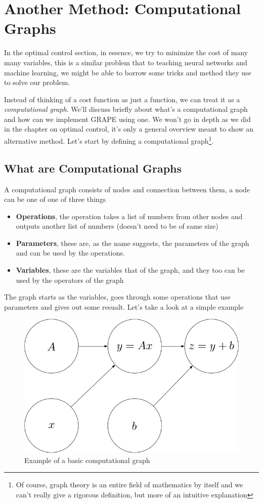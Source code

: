 \section{Another Method: Computational Graphs}
In the optimal control section, in essence, we try to minimize the cost of many many variables, this is a similar problem that to teaching neural networks and machine learning, we might be able to borrow some tricks and method they use to solve our problem.

Instead of thinking of a cost function as just a function, we can treat it as a \textit{computational graph}. We'll discuss briefly about what's a computational graph and how can we implement GRAPE using one. We won't go in depth as we did in the chapter on optimal control, it's only a general overview meant to show an alternative method. Let's start by defining a computational graph\footnote{Of course, graph theory is an entire field of mathematics by itself and we can't really give a rigorous definition, but more of an intuitive explanation}.

\subsection{What are Computational Graphs}
A computational graph consists of nodes and connection between them, a node can be one of one of three things
\begin{itemize}
    \item \textbf{Operations}, the operation takes a list of numbers from other nodes and outputs another list of numbers (doesn't need to be of same size) %
    \item \textbf{Parameters}, these are, as the name suggests, the parameters of the graph and can be used by the operations.
    \item \textbf{Variables}, these are the variables that of the graph, and they too can be used by the operators of the graph
\end{itemize}
The graph starts as the variables, goes through some operations that use parameters and gives out some resualt. Let's take a look at a simple example

\begin{figure}[H]
    \centering
    \includegraphics[width=0.4\columnwidth]{Example-comp-graph.png}
    \caption{Example of a basic computational graph}
    \label{fig:example-computational-graph}
\end{figure}

